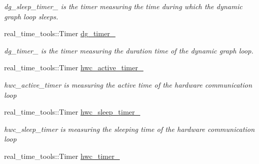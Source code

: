 \begin{DoxyCompactItemize}
\begin{DoxyCompactList}\small\item\em dg\+\_\+sleep\+\_\+timer\+\_\+ is the timer measuring the time during which the dynamic graph loop sleeps. \end{DoxyCompactList}\item 
\mbox{\label{classdynamic__graph_1_1DynamicGraphManager_ae73984087ad28fe492905eda861783bd}} 
real\+\_\+time\+\_\+tools\+::\+Timer \hyperlink{classdynamic__graph_1_1DynamicGraphManager_ae73984087ad28fe492905eda861783bd}{dg\+\_\+timer\+\_\+}
\begin{DoxyCompactList}\small\item\em dg\+\_\+timer\+\_\+ is the timer measuring the duration time of the dynamic graph loop. \end{DoxyCompactList}\item 
\mbox{\label{classdynamic__graph_1_1DynamicGraphManager_afe6c823bac22d756fc649f911fc1c29b}} 
real\+\_\+time\+\_\+tools\+::\+Timer \hyperlink{classdynamic__graph_1_1DynamicGraphManager_afe6c823bac22d756fc649f911fc1c29b}{hwc\+\_\+active\+\_\+timer\+\_\+}
\begin{DoxyCompactList}\small\item\em hwc\+\_\+active\+\_\+timer is measuring the active time of the hardware communication loop \end{DoxyCompactList}\item 
\mbox{\label{classdynamic__graph_1_1DynamicGraphManager_a89eb402f9e2eaa8dfad090f6c9845f6c}} 
real\+\_\+time\+\_\+tools\+::\+Timer \hyperlink{classdynamic__graph_1_1DynamicGraphManager_a89eb402f9e2eaa8dfad090f6c9845f6c}{hwc\+\_\+sleep\+\_\+timer\+\_\+}
\begin{DoxyCompactList}\small\item\em hwc\+\_\+sleep\+\_\+timer is measuring the sleeping time of the hardware communication loop \end{DoxyCompactList}\item 
\mbox{\label{classdynamic__graph_1_1DynamicGraphManager_a08ef83c411e5439204fa05b28f8e2794}} 
real\+\_\+time\+\_\+tools\+::\+Timer \hyperlink{classdynamic__graph_1_1DynamicGraphManager_a08ef83c411e5439204fa05b28f8e2794}{hwc\+\_\+timer\+\_\+}

\end{DoxyCompactItemize}
